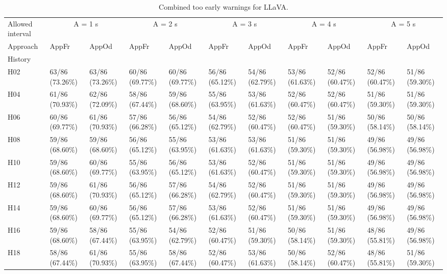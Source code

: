 \begin{table}[tbp]
\caption{Combined too early warnings for LLaVA.}
\label{tab:rq4-llava-too-early-paper-table}
\begin{tabular}{lllllllllll}
\toprule
Allowed interval & \multicolumn{2}{c}{A = 1 s} & \multicolumn{2}{c}{A = 2 s} & \multicolumn{2}{c}{A = 3 s} & \multicolumn{2}{c}{A = 4 s} & \multicolumn{2}{c}{A = 5 s} \\
Approach & AppFr & AppOd & AppFr & AppOd & AppFr & AppOd & AppFr & AppOd & AppFr & AppOd \\
History &  &  &  &  &  &  &  &  &  &  \\
\midrule
H02 & 63/86 (73.26\%) & 63/86 (73.26\%) & 60/86 (69.77\%) & 60/86 (69.77\%) & 56/86 (65.12\%) & 54/86 (62.79\%) & 53/86 (61.63\%) & 52/86 (60.47\%) & 52/86 (60.47\%) & 51/86 (59.30\%) \\
H04 & 61/86 (70.93\%) & 62/86 (72.09\%) & 58/86 (67.44\%) & 59/86 (68.60\%) & 55/86 (63.95\%) & 53/86 (61.63\%) & 52/86 (60.47\%) & 52/86 (60.47\%) & 51/86 (59.30\%) & 51/86 (59.30\%) \\
H06 & 60/86 (69.77\%) & 61/86 (70.93\%) & 57/86 (66.28\%) & 56/86 (65.12\%) & 54/86 (62.79\%) & 52/86 (60.47\%) & 52/86 (60.47\%) & 51/86 (59.30\%) & 50/86 (58.14\%) & 50/86 (58.14\%) \\
H08 & 59/86 (68.60\%) & 59/86 (68.60\%) & 56/86 (65.12\%) & 55/86 (63.95\%) & 53/86 (61.63\%) & 53/86 (61.63\%) & 51/86 (59.30\%) & 51/86 (59.30\%) & 49/86 (56.98\%) & 49/86 (56.98\%) \\
H10 & 59/86 (68.60\%) & 60/86 (69.77\%) & 55/86 (63.95\%) & 56/86 (65.12\%) & 53/86 (61.63\%) & 52/86 (60.47\%) & 51/86 (59.30\%) & 51/86 (59.30\%) & 49/86 (56.98\%) & 49/86 (56.98\%) \\
H12 & 59/86 (68.60\%) & 61/86 (70.93\%) & 56/86 (65.12\%) & 57/86 (66.28\%) & 54/86 (62.79\%) & 52/86 (60.47\%) & 51/86 (59.30\%) & 51/86 (59.30\%) & 49/86 (56.98\%) & 49/86 (56.98\%) \\
H14 & 59/86 (68.60\%) & 60/86 (69.77\%) & 56/86 (65.12\%) & 57/86 (66.28\%) & 53/86 (61.63\%) & 52/86 (60.47\%) & 51/86 (59.30\%) & 51/86 (59.30\%) & 49/86 (56.98\%) & 49/86 (56.98\%) \\
H16 & 59/86 (68.60\%) & 58/86 (67.44\%) & 55/86 (63.95\%) & 54/86 (62.79\%) & 52/86 (60.47\%) & 51/86 (59.30\%) & 50/86 (58.14\%) & 51/86 (59.30\%) & 48/86 (55.81\%) & 49/86 (56.98\%) \\
H18 & 58/86 (67.44\%) & 61/86 (70.93\%) & 55/86 (63.95\%) & 58/86 (67.44\%) & 52/86 (60.47\%) & 53/86 (61.63\%) & 50/86 (58.14\%) & 52/86 (60.47\%) & 48/86 (55.81\%) & 51/86 (59.30\%) \\

\end{tabular}
\end{table}
